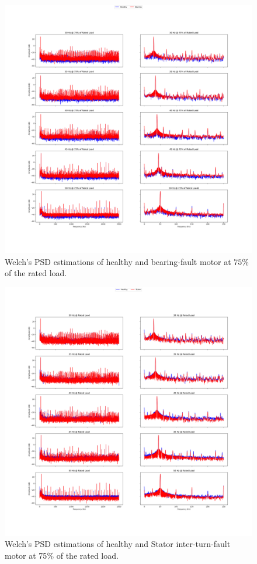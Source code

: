 \pagebreak
\begin{figure}[h]
	\centering
	\includegraphics[width=0.8\paperwidth,keepaspectratio=true]{./fig/psdbearing_75.png}
	\caption{Welch's PSD estimations of healthy and bearing-fault motor at $75\%$ of the rated load.}	
	\label{psdbearing75}
\end{figure}
\pagebreak
\begin{figure}[h]
	\centering
	\includegraphics[width=0.8\paperwidth,keepaspectratio=true]{./fig/psdstator_100.png}
	\caption{Welch's PSD estimations of healthy and Stator inter-turn-fault motor at 75$\%$ of the rated load.}	
	\label{psdstator100}
\end{figure}
